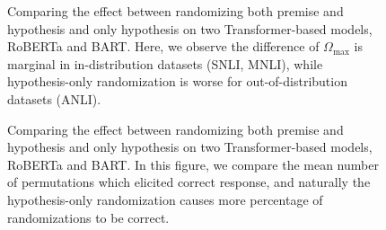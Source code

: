 \documentclass[letterpaper, 12pt]{report}
\begin{document}
\begin{figure}[ht]
    \centering
    \caption{Comparing the effect between randomizing both premise and hypothesis and only hypothesis on two Transformer-based models, RoBERTa and BART. Here, we observe the difference of $\Omega_{\text{max}}$ is marginal in in-distribution datasets (SNLI, MNLI), while hypothesis-only randomization is worse for out-of-distribution datasets (ANLI).}
    \label{fig:unli_hp_compare}
\end{figure}

\begin{figure}[ht]
  \centering
    \caption{Comparing the effect between randomizing both premise and hypothesis and only hypothesis on two Transformer-based models, RoBERTa and BART. In this figure, we compare the mean number of permutations which elicited correct response, and naturally the hypothesis-only randomization causes more percentage of randomizations to be correct.}
    \label{fig:unli_hp_compare_cor}
\end{figure}
\end{document}
